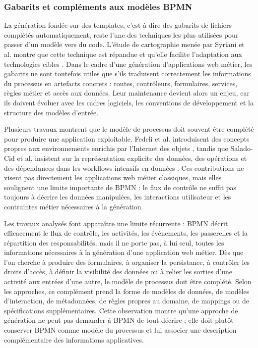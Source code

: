 \subsubsection{Gabarits et compléments aux modèles BPMN}

La génération fondée sur des templates, c'est-à-dire des gabarits de fichiers
complétés automatiquement, reste l'une des techniques les plus utilisées pour
passer d'un modèle vers du code. L'étude de cartographie menée par Syriani et
al. montre que cette technique est répandue et qu'elle facilite l'adaptation
aux technologies cibles \cite{syriani2018}. Dans le cadre d'une génération
d'applications web métier, les gabarits ne sont toutefois utiles que s'ils
traduisent correctement les informations du processus en artefacts concrets :
routes, contrôleurs, formulaires, services, règles métier et accès aux données.
Leur maintenance devient alors un enjeu, car ils doivent évoluer avec les
cadres logiciels, les conventions de développement et la structure des modèles
d'entrée.

Plusieurs travaux montrent que le modèle de processus doit souvent être
complété pour produire une application exploitable. Fedeli et al. introduisent
des concepts propres aux environnements enrichis par l'Internet des objets
\cite{fedeli2024}, tandis que Salado-Cid et al. insistent sur la représentation
explicite des données, des opérations et des dépendances dans les workflows
intensifs en données \cite{salado2024}. Ces contributions ne visent pas
directement les applications web métier classiques, mais elles soulignent une
limite importante de BPMN : le flux de contrôle ne suffit pas toujours à
décrire les données manipulées, les interactions utilisateur et les contraintes
métier nécessaires à la génération.

Les travaux analysés font apparaître une limite récurrente : BPMN décrit efficacement le flux de contrôle, les activités, les événements, les passerelles et la répartition des responsabilités, mais il ne porte pas, à lui seul, toutes les informations nécessaires à la génération d'une application web métier. Dès que l'on cherche à produire des formulaires, à organiser la persistance, à contrôler les droits d'accès, à définir la visibilité des données ou à relier les sorties d'une activité aux entrées d'une autre, le modèle de processus doit être complété. Selon les approches, ce complément prend la forme de modèles de données, de modèles d'interaction, de métadonnées, de règles propres au domaine, de mappings ou de spécifications supplémentaires. Cette observation montre qu'une approche de génération ne peut pas demander à BPMN de tout décrire ; elle doit plutôt conserver BPMN comme modèle du processus et lui associer une description complémentaire des informations applicatives.

